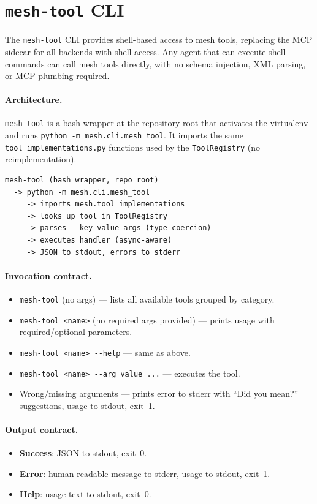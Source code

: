 \documentclass[11pt,letterpaper]{report}
\newcommand{\code}[1]{\texttt{#1}}
\begin{document}
\section{\code{mesh-tool} CLI}
\label{sec:mesh-tool}

The \code{mesh-tool} CLI provides shell-based access to mesh tools,
replacing the MCP sidecar for all backends with shell access. Any agent
that can execute shell commands can call mesh tools directly, with no schema
injection, XML parsing, or MCP plumbing required.

\paragraph{Architecture.}
\code{mesh-tool} is a bash wrapper at the repository root that activates
the virtualenv and runs \code{python -m mesh.cli.mesh\_tool}. It imports
the same \code{tool\_implementations.py} functions used by the
\code{ToolRegistry} (no reimplementation).

\begin{lstlisting}
mesh-tool (bash wrapper, repo root)
  -> python -m mesh.cli.mesh_tool
     -> imports mesh.tool_implementations
     -> looks up tool in ToolRegistry
     -> parses --key value args (type coercion)
     -> executes handler (async-aware)
     -> JSON to stdout, errors to stderr
\end{lstlisting}

\paragraph{Invocation contract.}
\begin{itemize}[nosep]
  \item \code{mesh-tool} (no args) --- lists all available tools grouped
        by category.
  \item \code{mesh-tool <name>} (no required args provided) --- prints
        usage with required/optional parameters.
  \item \code{mesh-tool <name> -{}-help} --- same as above.
  \item \code{mesh-tool <name> -{}-arg value ...} --- executes the tool.
  \item Wrong/missing arguments --- prints error to stderr with
        ``Did you mean?'' suggestions, usage to stdout, exit~1.
\end{itemize}

\paragraph{Output contract.}
\begin{itemize}[nosep]
  \item \textbf{Success}: JSON to stdout, exit~0.
  \item \textbf{Error}: human-readable message to stderr, usage to
        stdout, exit~1.
  \item \textbf{Help}: usage text to stdout, exit~0.
\end{itemize}
\end{document}

